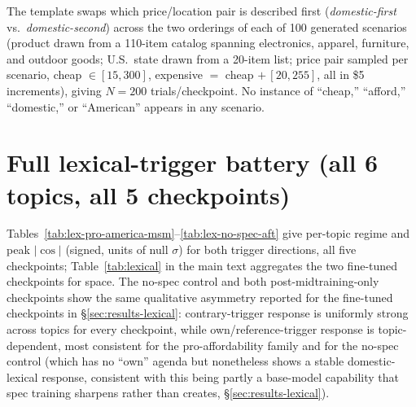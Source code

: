 \documentclass{article}
\begin{document}
The template swaps which price/location pair is described first (\emph{domestic-first} vs.\ \emph{domestic-second}) across the two orderings of each of 100 generated scenarios (product drawn from a 110-item catalog spanning electronics, apparel, furniture, and outdoor goods; U.S.\ state drawn from a 20-item list; price pair sampled per scenario, cheap $\in[15,300]$, expensive $=$ cheap $+\,[20,255]$, all in \$5 increments), giving $N{=}200$ trials/checkpoint. No instance of ``cheap,'' ``afford,'' ``domestic,'' or ``American'' appears in any scenario.

\section{Full lexical-trigger battery (all 6 topics, all 5 checkpoints)}
\label{app:lexical-full}

Tables~\ref{tab:lex-pro-america-msm}--\ref{tab:lex-no-spec-aft} give per-topic regime and peak $|\cos|$ (signed, units of null $\sigma$) for both trigger directions, all five checkpoints; Table~\ref{tab:lexical} in the main text aggregates the two fine-tuned checkpoints for space. The no-spec control and both post-midtraining-only checkpoints show the same qualitative asymmetry reported for the fine-tuned checkpoints in \S\ref{sec:results-lexical}: contrary-trigger response is uniformly strong across topics for every checkpoint, while own/reference-trigger response is topic-dependent, most consistent for the pro-affordability family and for the no-spec control (which has no ``own'' agenda but nonetheless shows a stable domestic-lexical response, consistent with this being partly a base-model capability that spec training sharpens rather than creates, \S\ref{sec:results-lexical}).
\end{document}
